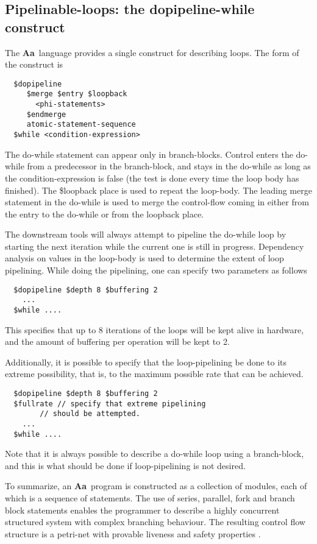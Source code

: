 \documentclass{article}
\newcommand{\Aa}{{\bf Aa}~}
\begin{document}
\subsection{Pipelinable-loops: the {\bf dopipeline-while} construct}

The \Aa language provides a single construct for describing loops.
The form of the construct is
\begin{verbatim}
  $dopipeline
     $merge $entry $loopback
       <phi-statements>
     $endmerge
     atomic-statement-sequence
  $while <condition-expression>
\end{verbatim}
The do-while statement can appear only in branch-blocks.  Control enters
the do-while from a predecessor in the branch-block, and stays in the
do-while as long as the condition-expression is false (the test is done
every time the loop body has finished).  The \$loopback
place is used to repeat the loop-body.  The leading merge statement
in the do-while is used to merge the control-flow coming in either from
the entry to the do-while or from the loopback place.

The downstream tools will always attempt to pipeline the do-while loop by
starting the next iteration while the current one is still in progress.
Dependency analysis on values in the loop-body is used to determine the
extent of loop pipelining.  While doing the pipelining, one can specify
two parameters as follows
\begin{verbatim}
  $dopipeline $depth 8 $buffering 2
    ...
  $while ....
\end{verbatim}
This specifies that up to 8 iterations of the loops will be kept alive
in hardware, and the amount of buffering per operation will be kept to
2.

Additionally, it is possible to specify that the loop-pipelining
be done to its extreme possibility, that is, to the maximum possible
rate that can be achieved.
\begin{verbatim}
  $dopipeline $depth 8 $buffering 2
  $fullrate // specify that extreme pipelining 
	    // should be attempted.
    ...
  $while ....
\end{verbatim}

Note that it is always possible to describe
a do-while loop using a branch-block, and this is what should be done
if loop-pipelining is not desired.


To summarize, an \Aa program is constructed as a collection of modules,
each of which is a sequence of statements.  The use of series,
parallel, fork and branch block
statements enables the programmer to describe a highly concurrent
structured system with complex branching behaviour.  
The resulting control flow structure is a
petri-net with provable liveness and safety properties \cite{ref:SameerPhD}.
\end{document}
